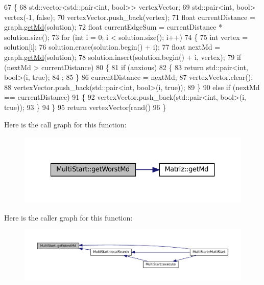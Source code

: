 \begin{DoxyCode}
67 \{
68   std::vector<std::pair<int, bool>> vertexVector;
69   std::pair<int, bool> vertex(-1, \textcolor{keyword}{false});
70   vertexVector.push\_back(vertex);
71   \textcolor{keywordtype}{float} currentDistance = graph.\hyperlink{classMatriz_a8df14a27d791f24206dd633b2a685c5b}{getMd}(solution);
72   \textcolor{keywordtype}{float} currentEdgeSum = currentDistance * solution.size();
73   \textcolor{keywordflow}{for} (\textcolor{keywordtype}{int} i = 0; i < solution.size(); i++)
74   \{
75     \textcolor{keywordtype}{int} vertex = solution[i];
76     solution.erase(solution.begin() + i);
77     \textcolor{keywordtype}{float} nextMd = graph.\hyperlink{classMatriz_a8df14a27d791f24206dd633b2a685c5b}{getMd}(solution);
78     solution.insert(solution.begin() + i, vertex);
79     \textcolor{keywordflow}{if} (nextMd > currentDistance)
80     \{
81       \textcolor{keywordflow}{if} (anxious)
82       \{
83         \textcolor{keywordflow}{return} std::pair<int, bool>(i, \textcolor{keyword}{true});
84         ;
85       \}
86       currentDistance = nextMd;
87       vertexVector.clear();
88       vertexVector.push\_back(std::pair<int, bool>(i, \textcolor{keyword}{true}));
89     \}
90     \textcolor{keywordflow}{else} \textcolor{keywordflow}{if} (nextMd == currentDistance)
91     \{
92       vertexVector.push\_back(std::pair<int, bool>(i, \textcolor{keyword}{true}));
93     \}
94   \}
95   \textcolor{keywordflow}{return} vertexVector[rand() %
96 \}
\end{DoxyCode}
Here is the call graph for this function\+:
\nopagebreak
\begin{figure}[H]
\begin{center}
\leavevmode
\includegraphics[width=327pt]{classMultiStart_a0ad5ed40a5c4ab964cb27f79343eed98_cgraph}
\end{center}
\end{figure}
Here is the caller graph for this function\+:
\nopagebreak
\begin{figure}[H]
\begin{center}
\leavevmode
\includegraphics[width=350pt]{classMultiStart_a0ad5ed40a5c4ab964cb27f79343eed98_icgraph}
\end{center}
\end{figure}
\mbox{\label{classMultiStart_af27ae5dbba5f924070f103b7bf5987a3}} 
